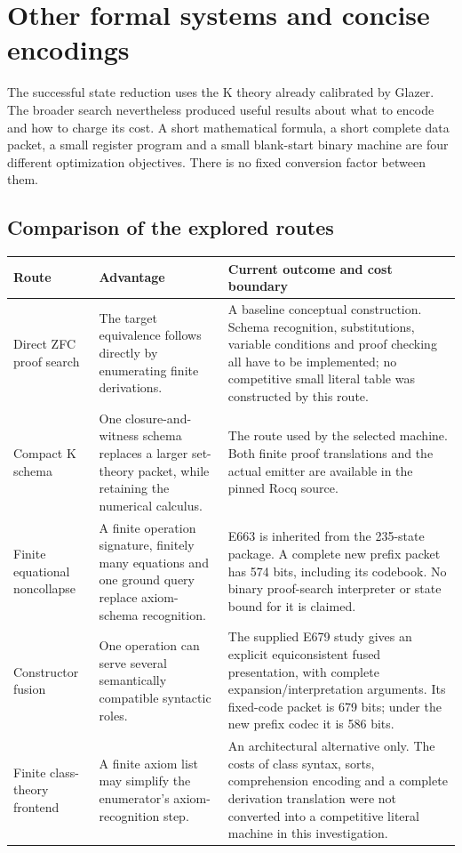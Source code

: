 \section{Other formal systems and concise encodings}
\label{sec:encodings}

The successful state reduction uses the K theory already calibrated by
Glazer. The broader search nevertheless produced useful results about
what to encode and how to charge its cost. A short mathematical formula,
a short complete data packet, a small register program and a small
blank-start binary machine are four different optimization objectives.
There is no fixed conversion factor between them.

\subsection{Comparison of the explored routes}

\begin{center}\small
\begin{tabularx}{\linewidth}{@{}p{30mm}XX@{}}\toprule
Route & Advantage & Current outcome and cost boundary\\\midrule
Direct ZFC proof search & The target equivalence follows directly by
enumerating finite derivations. & A baseline conceptual construction.
Schema recognition, substitutions, variable conditions and proof checking
all have to be implemented; no competitive small literal table was
constructed by this route.\\
Compact K schema & One closure-and-witness schema replaces a larger
set-theory packet, while retaining the numerical calculus. & The route
used by the selected machine. Both finite proof translations and the
actual emitter are available in the pinned Rocq source.\\
Finite equational noncollapse & A finite operation signature, finitely
many equations and one ground query replace axiom-schema recognition. &
E663 is inherited from the 235-state package. A complete new prefix packet
has 574 bits, including its codebook. No binary proof-search interpreter
or state bound for it is claimed.\\
Constructor fusion & One operation can serve several semantically
compatible syntactic roles. & The supplied E679 study gives an explicit
equiconsistent fused presentation, with complete expansion/interpretation
arguments. Its fixed-code packet is 679 bits; under the new prefix codec
it is 586 bits.\\
Finite class-theory frontend & A finite axiom list may simplify the
enumerator's axiom-recognition step. & An architectural alternative only.
The costs of class syntax, sorts, comprehension encoding and a complete
derivation translation were not converted into a competitive literal
machine in this investigation.\\
\bottomrule\end{tabularx}
\end{center}

